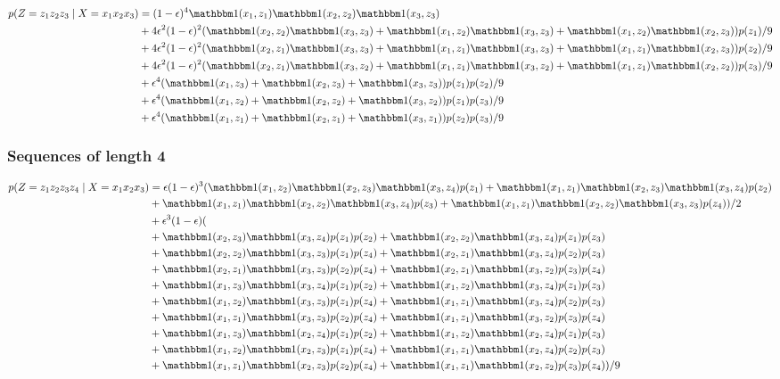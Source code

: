 \begin{equation*}
  \begin{split}
    p(Z=z_1z_2z_3 \gv X=x_1x_2x_3) &= (1-\e)^4\I(x_1, z_1)\I(x_2, z_2)\I(x_3, z_3)\\
        &+ 4\e^2(1-\e)^2 (\I(x_2, z_2)\I(x_3, z_3) + \I(x_1, z_2)\I(x_3, z_ 3) + \I(x_1, z_2)\I(x_2, z_3)) p(z_1)/9\\
        &+ 4\e^2(1-\e)^2 (\I(x_2, z_1)\I(x_3, z_3) + \I(x_1, z_1)\I(x_3, z_3) + \I(x_1, z_1)\I(x_2, z_3))p(z_2)/9\\
        &+ 4\e^2(1-\e)^2 (\I(x_2, z_1)\I(x_3, z_2) + \I(x_1, z_1)\I(x_3, z_2) + \I(x_1, z_1)\I(x_2, z_2))p(z_3)/9\\
        &+ \e^4 (\I(x_1, z_3) + \I(x_2, z_3) + \I(x_3, z_3))p(z_1)p(z_2)/9\\
        &+ \e^4 (\I(x_1, z_2) + \I(x_2, z_2) + \I(x_3, z_2))p(z_1)p(z_3)/9\\
        &+ \e^4 (\I(x_1, z_1) + \I(x_2, z_1) + \I(x_3, z_1))p(z_2)p(z_3)/9
  \end{split}
\end{equation*}

\subsubsection{Sequences of length 4}

\begin{equation*}
  \begin{split}
    p(Z=z_1z_2z_3z_4 \gv X=x_1x_2x_3)
      &= \e(1-\e)^3 (\I(x_1, z_2)\I(x_2, z_3)\I(x_3, z_4)p(z_1)
      +\I(x_1, z_1)\I(x_2, z_3)\I(x_3, z_4)p(z_2)\\
      &+\I(x_1, z_1)\I(x_2, z_2)\I(x_3, z_4)p(z_3)
      +\I(x_1, z_1)\I(x_2, z_2)\I(x_3, z_3)p(z_4))/2\\
      &+\e^3(1-\e)(\\
      &+ \I(x_2, z_3)\I(x_3, z_4)p(z_1)p(z_2) + \I(x_2, z_2)\I(x_3, z_4)p(z_1)p(z_3)\\
      &+ \I(x_2, z_2)\I(x_3, z_3)p(z_1)p(z_4) + \I(x_2, z_1)\I(x_3, z_4)p(z_2)p(z_3)\\
      &+ \I(x_2, z_1)\I(x_3, z_3)p(z_2)p(z_4) + \I(x_2, z_1)\I(x_3, z_2)p(z_3)p(z_4)\\
      &+ \I(x_1, z_3)\I(x _3, z_4)p(z_1)p(z_2) + \I(x_1, z_2)\I(x_3, z_4)p(z_1)p(z_3)\\
      &+ \I(x_1, z_2)\I(x_3, z_3)p(z_1)p(z_4) + \I(x_1, z_1)\I(x_3, z_4)p(z_2)p(z_3)\\
      &+ \I(x_1, z_1)\I(x_3, z_3)p(z_2)p(z_4) + \I(x_1, z_1)\I(x_3, z_2)p(z_3)p(z_4)\\
      &+ \I(x_1, z_3)\I(x_2, z_4)p(z_1)p(z_2) + \I(x_1, z_2)\I(x_2, z_4)p(z_1)p(z_3)\\
      &+ \I(x_1, z_2)\I(x_2, z_3)p(z_1)p(z_4) + \I(x_1, z_1)\I(x_2, z_4)p(z_2)p(z_3)\\
      &+ \I(x_1, z_1)\I(x_2, z_3)p(z_2)p(z_4) + \I(x_1, z_1)\I(x_2, z_2)p(z_3)p(z_4))/9
  \end{split}
\end{equation*}

